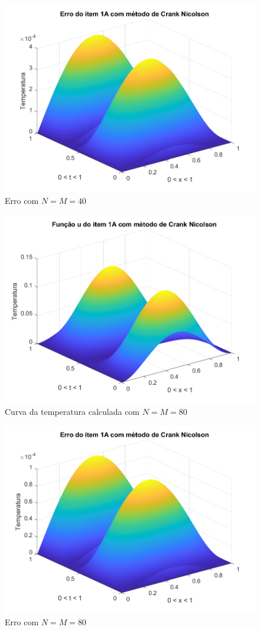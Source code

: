 \documentclass[12pt]{article}
\begin{document}
\begin{spacing}{1.5}
\begin{figure}
    \centering
    \includegraphics[width=0.8\linewidth]{Segunda_Tarefa/ItemC/nm40_erro_A.png}
    \caption{Erro com $N=M=40$}
    \label{fig:CA_nm40_erro}
\end{figure}

\begin{figure}
    \centering
    \includegraphics[width=0.8\linewidth]{Segunda_Tarefa/ItemC/nm80_calculada_A.png}
    \caption{Curva da temperatura calculada com $N=M=80$}
    \label{fig:CA_nm80_calculada}
\end{figure}

\begin{figure}
    \centering
    \includegraphics[width=0.8\linewidth]{Segunda_Tarefa/ItemC/nm80_erro_A.png}
    \caption{Erro com $N=M=80$}
    \label{fig:CA_nm80_erro}
\end{figure}


\end{spacing}
\end{document}
